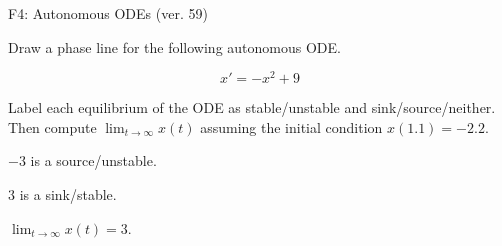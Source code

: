 \begin{exercise}
  \begin{exerciseTitle}F4: Autonomous ODEs (ver. 59)\end{exerciseTitle}
  \begin{exerciseStatement}
    

      Draw a phase line for the following 
      autonomous ODE.
    

    
\[x'= -x^{2} + 9\]

    

      Label each equilibrium of the ODE
      as stable/unstable and sink/source/neither.
      Then compute \(\lim_{t\to\infty}x(t)\)
      assuming the initial condition
      \(x( 1.1 )= -2.2\).
    

  \end{exerciseStatement}
  \begin{exerciseAnswer}
    

      \(-3\) is a source/unstable.
      
      \(3\) is a sink/stable.
    

    

      \(\lim_{t\to\infty}x(t)=3\).
    

  \end{exerciseAnswer}
\end{exercise}